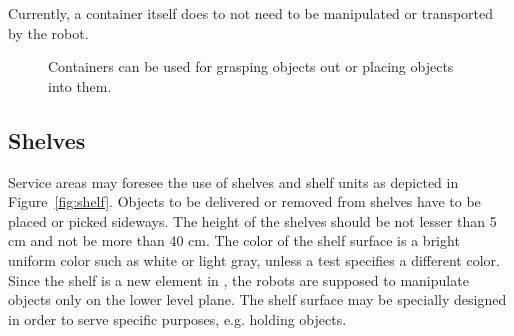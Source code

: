Currently, a container itself does to not need to be manipulated or transported by the robot.

\begin{figure} [h!]
\begin{center}
 \hspace{1cm}
\end{center}
\caption{Containers can be used for grasping objects out or placing objects into them.}
\label{fig:containers}
\end{figure}


\subsection{Shelves}
Service areas may foresee the use of shelves and shelf units as depicted in Figure~\ref{fig:shelf}. Objects to be delivered or removed from shelves have to be placed or picked sideways. The height of the shelves should be not lesser than 5 cm and not be more than 40 cm. The color of the shelf surface is a bright uniform color such as white or light gray, unless a test specifies a different color.
Since the shelf is a new element in \RCAW, the robots are supposed to manipulate objects only on the lower level plane.
The shelf surface may be specially designed in order to serve specific purposes, e.g. holding objects.

